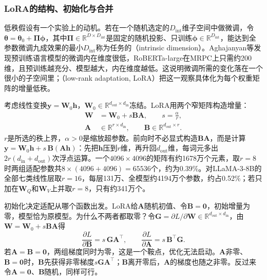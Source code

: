 \subsubsection{LoRA的结构、初始化与合并}
\label{sec:nlp-sft-low-rank}

低秩假设有一个实验上的动机。若在一个随机选定的$D_{\mathrm{int}}$维子空间中做微调，令$\bm\theta=\bm\theta_0+\bm\Pi\bm\phi$，其中$\bm\Pi\in\mathbb R^{D\times D_{\mathrm{int}}}$是固定的随机投影、只训练$\bm\phi\in\mathbb R^{D_{\mathrm{int}}}$，能达到全参数微调九成效果的最小$D_{\mathrm{int}}$称为任务的（intrinsic dimension）。Aghajanyan等发现预训练语言模型的微调内在维度很低，RoBERTa-large在MRPC上只需约200维，且预训练越充分、模型越大，内在维度越低。这说明微调所需的变化落在一个很小的子空间里；（low-rank adaptation, LoRA）把这一观察具体化为每个权重矩阵的增量低秩。

考虑线性变换$\bm y=\bm W_0\bm h$，$\bm W_0\in\mathbb R^{d_{\mathrm{out}}\times d_{\mathrm{in}}}$冻结。LoRA用两个窄矩阵构造增量：
\begin{equation}
\label{eq:nlp-sft-lora}
\begin{aligned}
 \bm W&=\bm W_0+s\bm{B}\bm{A},\qquad s=\frac{\alpha}{r},\\
 \bm A&\in\mathbb{R}^{r\times d_{\mathrm{in}}},\qquad
 \bm B\in\mathbb{R}^{d_{\mathrm{out}}\times r}.
\end{aligned}
\end{equation}
$r$是所选的秩上界，$\alpha>0$是缩放超参数。前向时不必显式构造$\bm B\bm A$，而是计算$\bm y=\bm W_0\bm h+s\,\bm B(\bm A\bm h)$：先把$\bm h$压到$r$维，再升回$d_{\mathrm{out}}$维，每词元多出$2r(d_{\mathrm{in}}+d_{\mathrm{out}})$次浮点运算。一个$4096\times4096$的矩阵有约1678万个元素，取$r=8$时两组适配参数共$8\times(4096+4096)=65536$个，约为0.39\%。对LLaMA-3-8B的全部七类线性层取$r=16$，每层131万、全模型约4194万个参数，约占0.52\%；若只加在$\bm W_Q$和$\bm W_V$上并取$r=8$，只有约341万个。

初始化决定适配从哪个函数出发。LoRA给$\bm A$随机初值、令$\bm B=\bm 0$，初始增量为零，模型恰为原模型。为什么不两者都取零？令$\bm G=\partial L/\partial\bm W\in\mathbb R^{d_{\mathrm{out}}\times d_{\mathrm{in}}}$，由$\bm W=\bm W_0+s\bm B\bm A$得
\[
 \frac{\partial L}{\partial\bm B}=s\,\bm G\bm A^{\top},\qquad
 \frac{\partial L}{\partial\bm A}=s\,\bm B^{\top}\bm G.
\]
若$\bm A=\bm B=\bm 0$，两组梯度同时为零，这是一个鞍点，优化无法启动。$\bm A$非零、$\bm B=\bm 0$时，$\bm B$先获得非零梯度$s\bm G\bm A^{\top}$；$\bm B$离开零后，$\bm A$的梯度也随之非零。反过来令$\bm A=\bm 0$、$\bm B$随机，同样可行。


